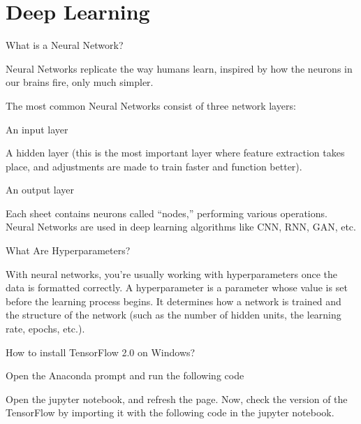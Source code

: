 	\chapter{Deep Learning}
	\resetquestioncounter{}
	\begin{qanda}
		\begin{question}
What is a Neural Network?
		\end{question}
		\begin{answer}
Neural Networks replicate the way humans learn, inspired by how the neurons in our brains fire, only much simpler.

The most common Neural Networks consist of three network layers:
	\begin{bulletedlist}
		\item An input layer
		\item A hidden layer (this is the most important layer where feature extraction takes place, and adjustments are made to train faster and function better).
		\item An output layer
	\end{bulletedlist}
 Each sheet contains neurons called ``nodes,'' performing various operations. Neural Networks are used in deep learning algorithms like CNN, RNN, GAN, etc.
		\end{answer}
	\end{qanda}


	\begin{qanda}
		\begin{question}
			What Are Hyperparameters?
		\end{question}
		\begin{answer}
With neural networks, you're usually working with hyperparameters once the data is formatted correctly. A hyperparameter is a parameter whose value is set before the learning process begins. It determines how a network is trained and the structure of the network (such as the number of hidden units, the learning rate, epochs, etc.).
		\end{answer}
	\end{qanda}


	\begin{qanda}
		\begin{question}
How to install TensorFlow 2.0 on Windows?
		\end{question}
		\begin{answer}
Open the Anaconda prompt and run the following code

Open the jupyter notebook, and refresh the page. Now, check the version of the TensorFlow by importing it with the following code in the jupyter notebook.

		\end{answer}
	\end{qanda}


